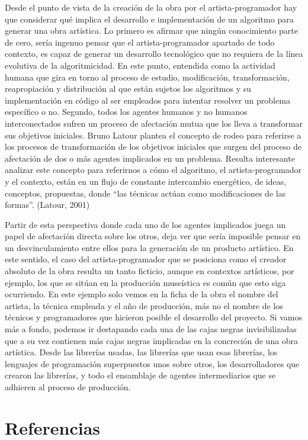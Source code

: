 Desde el punto de vista de la creación de la obra por el artista-programador hay que considerar qué implica el desarrollo e implementación de un algoritmo para generar una obra artística. Lo primero es afirmar que ningún conocimiento parte de cero, sería ingenuo pensar que el artista-programador apartado de todo contexto, es capaz de generar un desarrollo tecnológico que no requiera de la línea evolutiva de la algoritmicidad. En este punto, entendida como la actividad humana que gira en torno al proceso de estudio, modificación, transformación, reapropiación y distribución al que están sujetos los algoritmos y su implementación en código al ser empleados para intentar resolver un problema específico o no. Segundo, todos los agentes humanos y no humanos interconectados sufren un proceso de afectación mutua que los lleva a transformar sus objetivos iniciales. Bruno Latour plantea el concepto de rodeo para referirse a los procesos de transformación de los objetivos iniciales que surgen del proceso de afectación de dos o más agentes implicados en un problema. Resulta interesante analizar este concepto para referirnos a cómo el algoritmo, el artista-programador y el contexto, están en un flujo de constante intercambio energético, de ideas, conceptos, propuestas, donde “las técnicas actúan como modificaciones de las formas”. (Latour, 2001)

Partir de esta perspectiva donde cada uno de los agentes implicados juega un papel de afectación directa sobre los otros, deja ver que sería imposible pensar en un desvinculamiento entre ellos para la generación de un producto artístico. En este sentido, el caso del artista-programador que se posiciona como el creador absoluto de la obra resulta un tanto ficticio, aunque en contextos artísticos, por ejemplo, los que se sitúan en la producción museística es común que esto siga ocurriendo. En este ejemplo solo vemos en la ficha de la obra el nombre del artista, la técnica empleada y el año de producción, más no el nombre de los técnicos y programadores que hicieron posible el desarrollo del proyecto. Si vamos más a fondo, podemos ir destapando cada una de las cajas negras invisibilizadas que a su vez contienen más cajas negras implicadas en la concreción de una obra artística. Desde las librerías usadas, las librerías que usan esas librerías, los lenguajes de programación superpuestos unos sobre otros, los desarrolladores que crearon las librerías, y todo el ensamblaje de agentes intermediarios que se adhieren al proceso de producción.

\section{Referencias}

